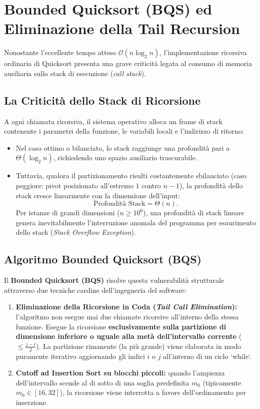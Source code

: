 \FloatBarrier
\section{Bounded Quicksort (BQS) ed Eliminazione della Tail Recursion}
\label{sec:bounded-quicksort}

Nonostante l'eccellente tempo atteso $\mathcal{O}(n \log_2 n)$, l'implementazione ricorsiva ordinaria di Quicksort presenta una grave criticità legata al consumo di memoria ausiliaria sullo stack di esecuzione (\textit{call stack}).

\subsection{La Criticità dello Stack di Ricorsione}
\label{subsec:stack-overflow-issue}

A ogni chiamata ricorsiva, il sistema operativo alloca un frame di stack contenente i parametri della funzione, le variabili locali e l'indirizzo di ritorno:
\begin{itemize}
  \item Nel caso ottimo o bilanciato, lo stack raggiunge una profondità pari a $\Theta(\log_2 n)$, richiedendo uno spazio ausiliario trascurabile.
  \item Tuttavia, qualora il partizionamento risulti costantemente sbilanciato (caso peggiore: pivot posizionato all'estremo $1$ contro $n-1$), la profondità dello stack cresce linearmente con la dimensione dell'input:
  \begin{equation}
    \text{Profondità Stack} = \Theta(n).
  \end{equation}
  Per istanze di grandi dimensioni ($n \ge 10^6$), una profondità di stack lineare genera inevitabilmente l'interruzione anomala del programma per esaurimento dello stack (\textit{Stack Overflow Exception}).
\end{itemize}

\subsection{Algoritmo Bounded Quicksort (BQS)}
\label{subsec:bqs-algorithm}

Il \textbf{Bounded Quicksort (BQS)} risolve questa vulnerabilità strutturale attraverso due tecniche cardine dell'ingegneria del software:
\begin{enumerate}
  \item \textbf{Eliminazione della Ricorsione in Coda (\textit{Tail Call Elimination}):} l'algoritmo non esegue mai due chiamate ricorsive all'interno della stessa funzione. Esegue la ricorsione \textbf{esclusivamente sulla partizione di dimensione inferiore o uguale alla metà dell'intervallo corrente} ($\le \frac{j - i}{2}$). La partizione rimanente (la più grande) viene elaborata in modo puramente iterativo aggiornando gli indici $i$ o $j$ all'interno di un ciclo `while`.
  \item \textbf{Cutoff ad Insertion Sort su blocchi piccoli:} quando l'ampiezza dell'intervallo scende al di sotto di una soglia predefinita $m_0$ (tipicamente $m_0 \in [16, 32]$), la ricorsione viene interrotta a favore dell'ordinamento per inserzione.
\end{enumerate}

